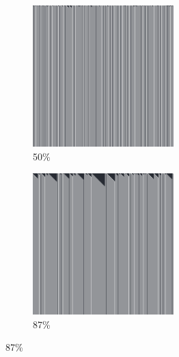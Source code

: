 \documentclass[12pt, fleqn]{report}                             %
\theoremstyle{break}                                            %
\begin{document}
\begin{figure}[ht!]
\begin{subfigure}[b]{0.4\linewidth}
          \includegraphics[width=0.6\textwidth]{Images/28/c.png}
          \caption{50\%}
        \end{subfigure}
        \begin{subfigure}[b]{0.4\linewidth}
          \includegraphics[width=0.6\textwidth]{Images/28/d.png}
          \caption{87\%}
        \end{subfigure}
      \end{figure}
\end{document}
